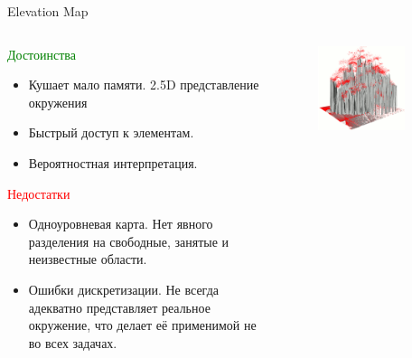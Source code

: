 \documentclass[9pt]{beamer}
\begin{document}
\begin{frame}{Elevation Map}
\begin{columns}
\begin{column}{0.50\textwidth}
  \begin{block}{\textcolor{green}{Достоинства}}
    \begin{itemize}
    \item
    { 
      Кушает мало памяти. 2.5D представление окружения
    }
    \item
    {
      Быстрый доступ к элементам.
    }
    \item
    {
      Вероятностная интерпретация.
    }
    \end{itemize}
  \end{block}

  \begin{block}{\textcolor{red}{Недостатки}}
    \begin{itemize}
    \item
    { 
      Одноуровневая карта. Нет явного разделения на свободные, занятые и неизвестные области.
    }
    \item
    {
      Ошибки дискретизации. Не всегда адекватно представляет реальное окружение, что делает её применимой не во всех задачах.
    }
    \end{itemize}
  \end{block}
\end{column}
\begin{column}{0.50\textwidth}
\begin{figure}[h]
    \centering
    \includegraphics[width=0.8\textwidth]{elev_tree.png}
\end{figure}
\end{column}
\end{columns}
\end{frame}
\end{document}
